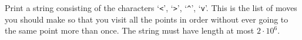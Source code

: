 
Print a string consisting of the characters `\verb!<!', `\verb!>!', `\verb!^!', `\verb!v!'.
This is the list of moves you should make so that you visit all the points in order without 
ever going to the same point more than once. The string must have length at most $2 \cdot 10^6$.
